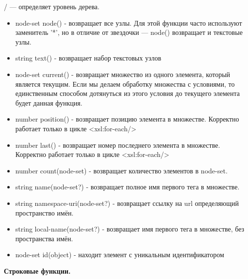 \documentclass[12pt,a4paper,oneside]{article} %
\begin{document}
/ — определяет уровень дерева.
\begin{itemize}
\item node-set node() - возвращает все узлы. Для этой функции часто используют заменитель '*', но в отличие от звездочки — node() возвращает и текстовые узлы.
\item string text() - возвращает набор текстовых узлов
\item node-set current() - возвращает множество из одного элемента, который является текущим. Если мы делаем обработку множества с условиями, то единственным способом дотянуться из этого условия до текущего элемента будет данная функция.
\item number position() - возвращает позицию элемента в множестве. Корректно работает только в цикле <xsl:for-each/>
\item number last() - возвращает номер последнего элемента в множестве. Корректно работает только в цикле <xsl:for-each/>
\item number count(node-set) - возвращает количество элементов в node-set.
\item string name(node-set?) - возвращает полное имя первого тега в множестве.
\item string namespace-uri(node-set?) - возвращает ссылку на url определяющий пространство имён.
\item string local-name(node-set?) - возвращает имя первого тега в множестве, без пространства имён.
\item node-set id(object) - находит элемент с уникальным идентификатором
\end{itemize}

\textbf{Строковые функции.}
\end{document}
